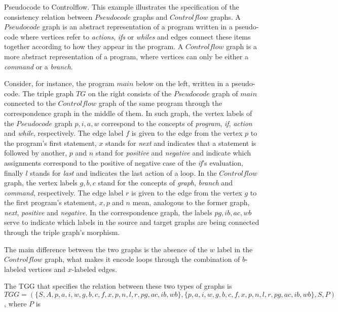 \documentclass[]{report}
\begin{document}
\begin{example}{Pseudocode to Controlflow.}
	\label{ex:pseudocode2controlflow}
	This example illustrates the specification of the consistency relation between $Pseudocode$ graphs and $Controlflow$ graphs. A $Pseudocode$ graph is an abstract representation of a program written in a pseudo-code where vertices refer to \textit{actions}, \textit{ifs} or \textit{whiles} and edges connect these items together according to how they appear in the program. A $Controlflow$ graph is a more abstract representation of a program, where vertices can only be either a \textit{command} or a \textit{branch}.
	
	Consider, for instance, the program $main$ below on the left, written in a pseudo-code. The triple graph $TG$ on the right consists of the $Pseudocode$ graph of $main$ connected to the $Controlflow$ graph of the same program through the correspondence graph in the middle of them. In such graph, the vertex labels of the $Pseudocode$ graph $p, i, a, w$ correspond to the concepts of \textit{program}, \textit{if}, \textit{action} and \textit{while}, respectively. The edge label $f$ is given to the edge from the vertex $p$ to the program's first statement, $x$ stands for \textit{next} and indicates that a statement is followed by another, $p$ and $n$ stand for \textit{positive} and \textit{negative} and indicate which assignments correspond to the positive of negative case of the \textit{if}'s evaluation, finally $l$ stands for \textit{last} and indicates the last action of a loop. In the $Controlflow$ graph, the vertex labels $g, b, c$ stand for the concepts of \textit{graph}, \textit{branch} and \textit{command}, respectively. The edge label $r$ is given to the edge from the vertex $g$ to the first program's statement, $x, p$ and $n$ mean, analogous to the former graph, \textit{next}, \textit{positive} and \textit{negative}. In the correspondence graph, the labels $pg, ib, ac, wb$ serve to indicate which labels in the source and target graphs are being connected through the triple graph's morphism.
	
	
	
	The main difference between the two graphs is the absence of the $w$ label in the $Controlflow$ graph, what makes it encode loops through the combination of $b$-labeled vertices and $x$-labeled edges.
	
	The TGG that specifies the relation between these two types of graphs is $TGG = (\{S, A, p, a, i, w, g, b, c, f, x, p, n, l, r, pg, ac, ib, wb\}, \{p, a, i, w, g, b, c, f, x, p, n, l, r, pg, ac, ib, wb\}, S, P)$, where $P$ is
	

\end{example}
\end{document}
